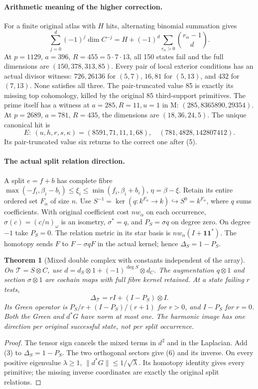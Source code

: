 \documentclass[10pt,a4paper]{article}
\newtheorem{theorem}{Theorem}
\begin{document}
\paragraph{Arithmetic meaning of the higher correction.}
For a finite original atlas with $H$ hits, alternating binomial summation gives
\[
 \boxed{\sum_{j=0}^d(-1)^j\dim C^{-j}
 =H+(-1)^d\sum_{r_\alpha>0}\binom{r_\alpha-1}{d}.}         \tag{5}
\]
At $p=1129$, $a=396$, $R=455=5\cdot7\cdot13$, all 150 states fail and
the full dimensions are $(150,378,313,85)$. Every pair of local exterior
conditions has an actual divisor witness: $726,26136$ for $(5,7)$,
$16,81$ for $(5,13)$, and $432$ for $(7,13)$. None satisfies all three.
The pair-truncated value 85 is exactly its missing top cohomology, killed
by the original 85 third-support primitives. The prime itself has a witness
at $a=285,R=11,u=1$ in M: $(285,8365890,29354)$.
At $p=2689$, $a=781$, $R=435$, the dimensions are $(18,36,24,5)$.
The unique canonical hit is
\[
 E:\ (u,h,r,s,\kappa)=(8591,71,11,1,68),\quad
 (781,4828,142807412).
\]
Its pair-truncated value six returns to the correct one after (5).

\paragraph{The actual split relation direction.}
A split $e=f+b$ has complete fibre
$\max(-f_i,\beta_i-b_i)\le\xi_i\le\min(f_i,\beta_i+b_i)$,
$\eta=\beta-\xi$. Retain its entire ordered set $F_\alpha$ of size $n$.
Use $S^{-1}=\ker(q:k^{F_\alpha}\to k)\hookrightarrow S^0=k^{F_\alpha}$,
where $q$ sums coefficients. With original coefficient cost $nw_\alpha$
on each occurrence, $\sigma(c)=(c/n)_\omega$ is an isometry,
$\sigma^*=q$, and $P_S=\sigma q$ on degree zero. On degree $-1$ take
$P_S=0$. The relation metric in its star basis is $nw_\alpha(I+\mathbf1\mathbf1^*)$.
The homotopy sends $F$ to $F-\sigma qF$ in the actual kernel; hence
$\Delta_S=1-P_S$.

\begin{theorem}[Mixed double complex with constants independent of the array]
On $\mathcal T=S\otimes C$, use
$d=d_S\otimes1+(-1)^{\deg S}\otimes d_C$. The augmentation $q\otimes1$
and section $\sigma\otimes1$ are cochain maps with full fibre kernel retained.
At a state failing $r$ tests,
\[
 \boxed{\Delta_{\mathcal T}=rI+(I-P_S)\otimes I.}           \tag{6}
\]
Its Green operator is $P_S/r+(I-P_S)/(r+1)$ for $r>0$, and $I-P_S$ for
$r=0$. Both the Green and $d^*G$ have norm at most one. The harmonic image
has one direction per original successful state, not per split occurrence.
\end{theorem}
\begin{proof}
The tensor sign cancels the mixed terms in $d^2$ and in the Laplacian.
Add (3) to $\Delta_S=1-P_S$. The two orthogonal sectors give (6) and its
inverse. On every positive eigenvalue $\lambda\ge1$,
$\|d^*G\|\le1/\sqrt\lambda$. Its homotopy identity gives every primitive;
the missing inverse coordinates are exactly the original split relations.
\end{proof}
\end{document}
